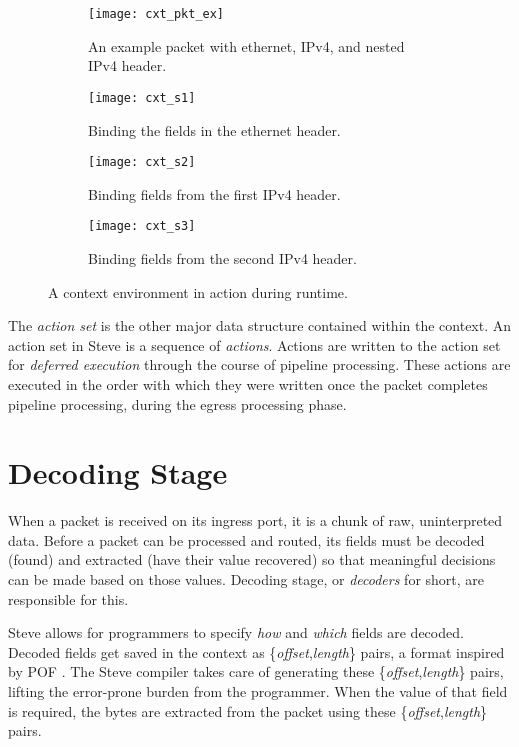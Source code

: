 \begin{figure}[ht]
\begin{subfigure}[t]{.45\textwidth}
  \centering
  \texttt{[image: cxt\_pkt\_ex]}
  \caption{An example packet with ethernet, IPv4, and nested IPv4 header.}
  \label{fg:view1}
\end{subfigure}%
\hfill
\begin{subfigure}[t]{.45\textwidth}
  \centering
  \texttt{[image: cxt\_s1]}
  \caption{Binding the fields in the ethernet header.}
  \label{fg:view2}
\end{subfigure}

\begin{subfigure}[t]{.45\textwidth}
  \centering
  \texttt{[image: cxt\_s2]}
  \caption{Binding fields from the first IPv4 header.}
  \label{fg:view3}
\end{subfigure}%
\hfill
\begin{subfigure}[t]{.45\textwidth}
  \centering
  \texttt{[image: cxt\_s3]}
  \caption{Binding fields from the second IPv4 header.}
  \label{fg:view4}
\end{subfigure}
\caption{A context environment in
action during runtime.} \label{fg:ContextEnvWorking} 
\end{figure}

The \textit{action set} is the other major data structure contained within the
context. An action set in Steve is a sequence of \textit{actions}. Actions are written to the action set for \textit{deferred execution}
through the course of pipeline processing. These actions are executed in the order with which they were written once the
packet completes pipeline processing, during the egress processing phase.

\section{Decoding Stage} \label{decoder_desc}

When a packet is received on its ingress port, it is a chunk of raw,
uninterpreted data. Before a packet can be processed and routed, its
fields must be decoded (found) and extracted (have their value recovered) so that meaningful decisions can be made
based on those values. Decoding stage, or \textit{decoders} for short, are
responsible for this.

Steve allows for programmers to specify \textit{how} and \textit{which} fields
are decoded. Decoded fields get saved in the context as \{\textit{offset},\textit{length}\} pairs, a
format inspired by POF \cite{pof, pof_fis, pof_impl}. The Steve compiler takes
care of generating these \{\textit{offset},\textit{length}\} pairs, lifting the error-prone burden
from the programmer. When the value of that field is required, the bytes are
extracted from the packet using these \{\textit{offset},\textit{length}\} pairs.

